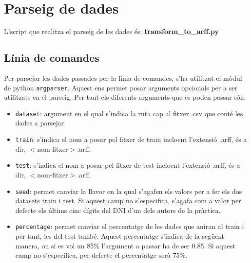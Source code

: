 \documentclass[../informe.tex]{subfiles}
\begin{document}
    \section{Parseig de dades}
    L'script que realitza el parseig de les dades és: \textbf{transform\_to\_arff.py}

    \subsection{Línia de comandes}
    Per parsejar les dades passades per la línia de comandes, s'ha utilitzat el mòdul de python \texttt{argparser}. Aquest ens permet posar arguments opcionals per a ser utilitzats en el parseig. Per tant els diferents arguments que es poden passar són:
    \begin{itemize}
        \item \texttt{dataset}: argument en el qual s'indica la ruta cap al fitxer .csv que conté les dades a parsejar 
        \item \texttt{train}: s'indica el nom a posar pel fitxer de train incloent l'extensió .arff, és a dir, $<$nom-fitxer$>$.arff.
        \item \texttt{test}: s'indica el nom a posar pel fitxer de test incloent l'extensió .arff, és a dir, $<$nom-fitxer$>$.arff.
        \item \texttt{seed}: permet canviar la llavor en la qual s'agafen els valors per a fer els dos datasets train i test. Si aquest camp no s'especifica, s'agafa com a valor per defecte els últims cinc dígits del DNI d'un dels autors de la pràctica.
        \item \texttt{percentage}: permet canviar el percentatge de les dades que aniran al train i per tant, les del test també. Aquest percentatge s'indica de la següent manera, on si es vol un 85\% l'argument a passar ha de ser 0.85. Si aquest camp no s'especifica, per defecte el percentatge serà 75\%.
    \end{itemize}
\end{document}
